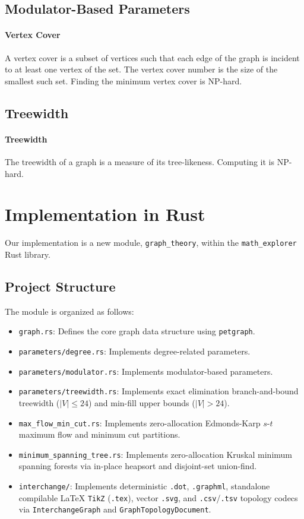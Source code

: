 \documentclass{article}
\begin{document}
\subsection{Modulator-Based Parameters}
\paragraph{Vertex Cover} A vertex cover is a subset of vertices such that each edge of the graph is incident to at least one vertex of the set. The vertex cover number is the size of the smallest such set. Finding the minimum vertex cover is NP-hard.

\subsection{Treewidth}
\paragraph{Treewidth} The treewidth of a graph is a measure of its tree-likeness. Computing it is NP-hard.

\section{Implementation in Rust}
Our implementation is a new module, \texttt{graph\_theory}, within the \texttt{math\_explorer} Rust library.

\subsection{Project Structure}
The module is organized as follows:
\begin{itemize}
    \item \texttt{graph.rs}: Defines the core graph data structure using \texttt{petgraph}.
    \item \texttt{parameters/degree.rs}: Implements degree-related parameters.
    \item \texttt{parameters/modulator.rs}: Implements modulator-based parameters.
    \item \texttt{parameters/treewidth.rs}: Implements exact elimination branch-and-bound treewidth ($|V| \le 24$) and min-fill upper bounds ($|V| > 24$).
    \item \texttt{max\_flow\_min\_cut.rs}: Implements zero-allocation Edmonds-Karp $s$-$t$ maximum flow and minimum cut partitions.
    \item \texttt{minimum\_spanning\_tree.rs}: Implements zero-allocation Kruskal minimum spanning forests via in-place heapsort and disjoint-set union-find.
    \item \texttt{interchange/}: Implements deterministic \texttt{.dot}, \texttt{.graphml}, standalone compilable \LaTeX{} \texttt{TikZ} (\texttt{.tex}), vector \texttt{.svg}, and \texttt{.csv}/\texttt{.tsv} topology codecs via \texttt{InterchangeGraph} and \texttt{GraphTopologyDocument}.
\end{itemize}
\end{document}
